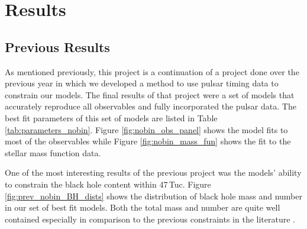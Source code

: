 


\section{Results}



\subsection{Previous Results}

As mentioned previously, this project is a continuation of a project done over the previous year in
which we developed a method to use pulsar timing data to constrain our models. The final results of
that project were a set of models that accurately reproduce all observables and fully incorporated
the pulsar data. The best fit parameters of this set of models are listed in Table
\ref{tab:parameters_nobin}. Figure \ref{fig:nobin_obs_panel} shows the model fits to most of
the observables while Figure \ref{fig:nobin_mass_fun} shows the fit to the stellar mass function
data.

One of the most interesting results of the previous project was the models' ability to constrain the
black hole content within 47\,Tuc. Figure \ref{fig:prev_nobin_BH_dists} shows the distribution of
black hole mass and number in  our set of best fit models. Both the total mass and number are quite
well contained especially in comparison to the previous constraints in the literature \citep[see
	e.g.][]{Henault-Brunet2020,Weatherford2019}.


